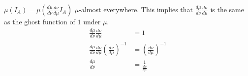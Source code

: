 \documentclass[12pt, letterpaper]{article}
\begin{document}
\begin{enumerate} [label = \textbf{\alph*)}]
		$\mu(I_A) = \mu(\frac{d\mu}{d\nu}\frac{d\nu}{d\mu}I_A)$	$\mu$-almost everywhere. \newline This implies that $\frac{d\mu}{d\nu}\frac{d\nu}{d\mu}$ is the same as the ghost function of $1$ under $\mu$. 
		\begin{align*}
			\frac{d\mu}{d\nu}\frac{d\nu}{d\mu} & = 1 \tag{$\mu$-almost everywhere} \\		
			\frac{d\mu}{d\nu}\frac{d\nu}{d\mu}(\frac{d\nu}{d\mu})^{-1} & = (\frac{d\nu}{d\mu})^{-1}  \tag{$\mu$-almost everywhere} \\					
				\frac{d\mu}{d\nu} & = \frac{1}{\frac{d\nu}{d\mu}} \tag{$\mu$-almost everywhere} 
		\end{align*}
		
	\end{enumerate}
\end{document}
